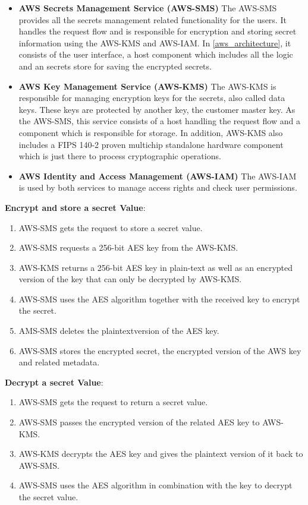 \documentclass[runningheads]{llncs}
\begin{document}
\begin{itemize}
    \setlength\itemsep{1mm}
    \item \textbf{AWS Secrets Management Service (AWS-SMS)}\newline
    The AWS-SMS provides all the secrets management related functionality for the users. It handles the request flow and is responsible for encryption and storing secret information using the AWS-KMS and AWS-IAM. In \autoref{aws_architecture}, it consists of the user interface, a host component which includes all the logic and an secrets store for saving the encrypted secrets.
    \item \textbf{AWS Key Management Service (AWS-KMS)}\newline
    The AWS-KMS is responsible for managing encryption keys for the secrets, also called data keys. These keys are protected by another key, the customer master key. As the AWS-SMS, this service consists of a host handling the request flow and a component which is responsible for storage. In addition, AWS-KMS also includes a FIPS 140-2 \cite{fips140} proven multichip standalone hardware component which is just there to process cryptographic operations. 
    \item \textbf{AWS Identity and Access Management (AWS-IAM)}\newline
    The AWS-IAM is used by both services to manage access rights and check user permissions.
\end{itemize}

\noindent
\textbf{Encrypt and store a secret Value}:
\begin{enumerate}
    \setlength\itemsep{1mm}
    \item AWS-SMS gets the request to store a secret value.
    \item AWS-SMS requests a 256-bit AES key from the AWS-KMS.
    \item AWS-KMS returns a 256-bit AES key in plain-text as well as an encrypted version of the key that can only be decrypted by AWS-KMS.
    \item AWS-SMS uses the AES algorithm together with the received key to encrypt the secret.
    \item AMS-SMS deletes the plaintextversion of the AES key.
    \item AWS-SMS stores the encrypted secret, the encrypted version of the AWS key and related metadata.
\end{enumerate}

\noindent
\textbf{Decrypt a secret Value}:
\begin{enumerate}
    \setlength\itemsep{1mm}
    \item AWS-SMS gets the request to return a secret value.
    \item AWS-SMS passes the encrypted version of the related AES key to AWS-KMS.
    \item AWS-KMS decrypts the AES key and gives the plaintext version of it back to AWS-SMS.
    \item AWS-SMS uses the AES algorithm in combination with the key to decrypt the secret value.
\end{enumerate}
\end{document}
